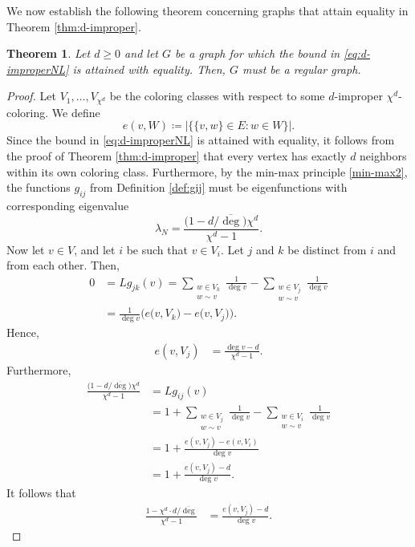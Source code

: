 \documentclass{article}
\theoremstyle{plain}
\newtheorem{theorem}{Theorem}[section]
\theoremstyle{definition}
\theoremstyle{remark}
\begin{document}
We now establish the following theorem concerning graphs that attain equality in Theorem \ref{thm:d-improper}.

\begin{theorem}\label{thm:d-improperequality}
    Let $d\geq0$ and let $G$ be a graph for which the bound in \eqref{eq:d-improperNL} is attained with equality. Then, $G$ must be a regular graph. 
\end{theorem}
\begin{proof}
    Let $V_1,\ldots,V_{\chi^d}$ be the coloring classes with respect to some $d$-improper $\chi^d$-coloring. We define \[e(v,W)\coloneqq \bigl|\bigl\{\{v,w\}\in E\colon w\in W\bigr\}\bigr|.\]
    Since the bound in \eqref{eq:d-improperNL} is attained with equality, it follows from the proof of Theorem \ref{thm:d-improper} that every vertex has exactly $d$ neighbors within its own coloring class. Furthermore, by the min-max principle \eqref{min-max2}, the functions $g_{ij}$ from Definition \ref{def:gij} must be eigenfunctions with corresponding eigenvalue
    \[
    \lambda_N = \frac{\bigl(1-d/\overline{\deg}\bigr)\chi^d}{\chi^d-1}.
    \]
    Now let $v\in V$, and let $i$ be such that $v\in V_i$. Let $j$ and $k$ be distinct from $i$ and from each other. Then,
    \begin{align*}
        0 &= Lg_{jk}(v) = \sum_{\substack{w\in V_k\\ w\sim v}}\frac1{\deg v} - \sum_{\substack{w\in V_j\\ w\sim v}}\frac1{\deg v} \\
        &= \frac1{\deg v}\bigl(e\bigl(v,V_k\bigr) - e\bigl(v,V_j\bigr)\bigr).
    \end{align*}
    Hence,
    \begin{align*}
        e(v,V_j) &=  \frac{\deg v - d}{\chi^d-1}.
    \end{align*}
    Furthermore,
    \begin{align*}
        \frac{\bigl(1-d/\overline{\deg}\bigr)\chi^d}{\chi^d-1} &= Lg_{ij}(v)\\
        &= 1+ \sum_{\substack{w\in V_j\\ w\sim v}}\frac1{\deg v} - \sum_{\substack{w\in V_i\\ w\sim v}}\frac1{\deg v}\\
        &= 1+\frac{e(v,V_j) - e(v,V_i)}{\deg v}\\
        &= 1+\frac{e(v,V_j)-d}{\deg v}.
    \end{align*}
    It follows that
    \begin{align*}
        \frac{1-\chi^d\cdot d/\overline{\deg}}{\chi^d-1} &= \frac{e(v,V_j)-d}{\deg v}.

\end{align*}
\end{proof}
\end{document}
